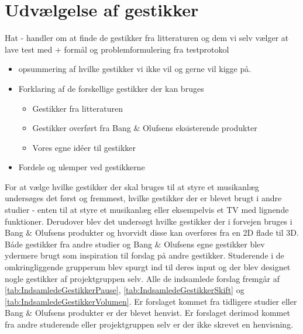 \section{Udvælgelse af gestikker}
\label{UdvaelgelseAfGestikker}
%
Hat - handler om at finde de gestikker fra litteraturen og dem vi selv vælger at lave test med + formål og problemformulering fra testprotokol
%

\begin{itemize}
  \item opsummering af hvilke gestikker vi ikke vil og gerne vil kigge på.
  \item Forklaring af de forskellige gestikker der kan bruges
  \begin{itemize}
  	\item Gestikker fra litteraturen
  	\item Gestikker overført fra Bang $\&$ Olufsens eksisterende produkter
  	\item Vores egne idéer til gestikker
  \end{itemize}
  \item Fordele og ulemper ved gestikkerne
\end{itemize}

For at vælge hvilke gestikker der skal bruges til at styre et musikanlæg undersøges det først og fremmest, hvilke gestikker der er blevet brugt i andre studier - enten til at styre et musikanlæg eller eksempelvis et TV med lignende funktioner. Derudover blev det undersøgt hvilke gestikker der i forvejen bruges i Bang $\&$ Olufsens produkter og hvorvidt disse kan overføres fra en 2D flade til 3D. Både gestikker fra andre studier og Bang $\&$ Olufsens egne gestikker blev ydermere brugt som inspiration til forslag på andre gestikker. Studerende i de omkringliggende grupperum blev spurgt ind til deres input og der blev designet nogle gestikker af projektgruppen selv. Alle de indsamlede forslag fremgår af \autoref{tab:IndsamledeGestikkerPause}, \autoref{tab:IndsamledeGestikkerSkift} og \autoref{tab:IndsamledeGestikkerVolumen}. Er forslaget kommet fra tidligere studier eller Bang $\&$ Olufsens produkter er der blevet henvist. Er forslaget derimod kommet fra andre studerende eller projektgruppen selv er der ikke skrevet en henvisning. 




